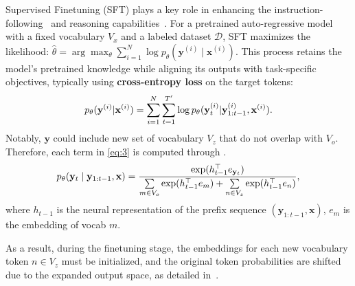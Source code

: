 Supervised Finetuning (SFT) plays a key role in enhancing the instruction-following~\citep{mishra2021reframing,sanh2021multitask,wei2022chain} and reasoning capabilities~\citep{lambert2024t}. For a pretrained auto-regressive model with a fixed vocabulary \( V_x \) and a labeled dataset  $\mathcal{D}$, SFT maximizes the likelihood:
$
\hat{\theta} = \arg\max_{\theta} \sum_{i=1}^N \log p_\theta\left(\mathbf{y}^{(i)} \mid \mathbf{x}^{(i)}\right).
$
This process retains the model’s pretrained knowledge while aligning its outputs with task-specific objectives, typically using \textbf{cross-entropy loss} on the target tokens:
\begin{equation} \label{eq:3} \small
    p_\theta(\mathbf{y}^{(i)} | \mathbf{x}^{(i)}) = \sum_{i=1}^N \sum_{t=1}^{T'} \log p_\theta(\mathbf{y}_t^{(i)} | \mathbf{y}^{(i)}_{1:t-1},\mathbf{x}^{(i)}).
\end{equation}
Notably, $\mathbf{y}$ could include new set of vocabulary $V_{z}$ that do not overlap with $V_{o}$. Therefore, each term in \cref{eq:3} is computed through .
\begin{equation} \label{eq:4} 
\small
    p_\theta(\mathbf{y}_t \mid \mathbf{y}_{1:t-1},\mathbf{x}) = \frac{\exp(h_{t-1}^\top e_{\mathbf{y}_t})}{\sum\limits_{m \in V_{o}} \exp(h_{t-1}^\top e_m) + \sum\limits_{n \in V_{z}} \exp(h_{t-1}^\top e_n)},
\end{equation} 
where $h_{t-1}$ is the neural representation of the prefix sequence $(\mathbf{y}_{1:t-1},\mathbf{x})$, $e_m$ is the embedding of vocab $m$.

As a result, during the finetuning stage, the embeddings for each new vocabulary token \( n \in V_z \) must be initialized, and the original token probabilities are shifted due to the expanded output space, as detailed in~\citet{hewitt2021initializing}.



